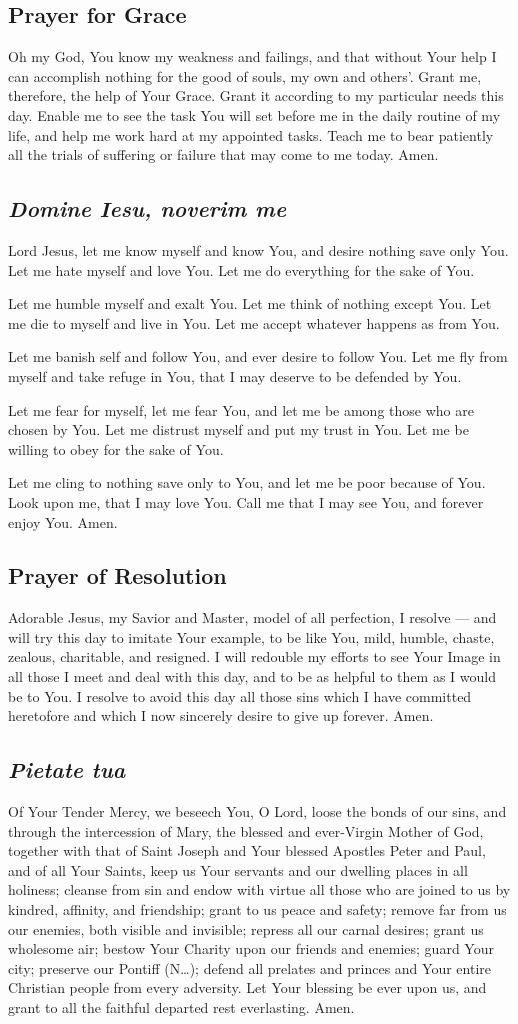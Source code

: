 \documentclass[12pt]{article}
\newcommand{\prayertitle}[1]{\subsection{#1}}
\newcommand{\insertname}{(N\dots)\xspace}
\newcommand{\emphasis}[1]{\emph{#1}}
\newcommand{\emphasis}[1]{\textsl{#1}}
\newcommand{\foreign}[1]{\emphasis{#1}}
\begin{document}
\prayertitle{Prayer for Grace}
\label{prayer:grace}
Oh my God, You know my weakness and failings, and that without Your help I can accomplish nothing for the good of souls, my own and others'.
Grant me, therefore, the help of Your Grace.
Grant it according to my particular needs this day.
Enable me to see the task You will set before me in the daily routine of my life, and help me work hard at my appointed tasks.
Teach me to bear patiently all the trials of suffering or failure that may come to me today. Amen.

\prayertitle{\foreign{Domine Iesu, noverim me}}
\label{prayer:noverim_me}
Lord Jesus, let me know myself and know You,
and desire nothing save only You.
Let me hate myself and love You.
Let me do everything for the sake of You.

Let me humble myself and exalt You.
Let me think of nothing except You.
Let me die to myself and live in You.
Let me accept whatever happens as from You.

Let me banish self and follow You,
and ever desire to follow You.
Let me fly from myself and take refuge in You,
that I may deserve to be defended by You.

Let me fear for myself, let me fear You,
and let me be among those who are chosen by You.
Let me distrust myself and put my trust in You.
Let me be willing to obey for the sake of You.

Let me cling to nothing save only to You,
and let me be poor because of You.
Look upon me, that I may love You.
Call me that I may see You,
and forever enjoy You.
Amen.

\prayertitle{Prayer of Resolution}
\label{prayer:resolution}
Adorable Jesus, my Savior and Master, model of all perfection, I resolve --- and will try this day \textemdash{} to imitate Your example, to be like You, mild, humble, chaste, zealous, charitable, and resigned.
I will redouble my efforts to see Your Image in all those I meet and deal with this day, and to be as helpful to them as I would be to You.
I resolve to avoid this day all those sins which I have committed heretofore and which I now sincerely desire to give up forever. Amen.

\prayertitle{\foreign{Pietate tua}}
\label{prayer:pietate_tua}
Of Your Tender Mercy, we beseech You, O Lord, loose the bonds of our sins, and through the intercession of Mary, the blessed and ever-Virgin Mother of God, together with that of Saint Joseph and Your blessed Apostles Peter and Paul, and of all Your Saints, keep us Your servants and our dwelling places in all holiness;
cleanse from sin and endow with virtue all those who are joined to us by kindred, affinity, and friendship;
grant to us peace and safety;
remove far from us our enemies, both visible and invisible;
repress all our carnal desires;
grant us wholesome air;
bestow Your Charity upon our friends and enemies;
guard Your city;
preserve our Pontiff \insertname;
defend all prelates and princes and Your entire Christian people from every adversity.
Let Your blessing be ever upon us, and grant to all the faithful departed rest everlasting.
Amen.
\end{document}
